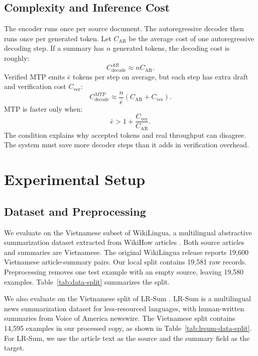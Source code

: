 \documentclass[11pt]{article}
\begin{document}
\subsection{Complexity and Inference Cost}

The encoder runs once per source document.
The autoregressive decoder then runs once per generated token.
Let $C_{\mathrm{AR}}$ be the average cost of one autoregressive decoding step.
If a summary has $n$ generated tokens, the decoding cost is roughly:
\begin{equation}
C_{\mathrm{decode}}^{AR}\approx nC_{\mathrm{AR}}.
\end{equation}
Verified MTP emits $\bar{e}$ tokens per step on average, but each step has extra draft and verification cost $C_{\mathrm{ver}}$:
\begin{equation}
C_{\mathrm{decode}}^{MTP}
\approx \frac{n}{\bar{e}}(C_{\mathrm{AR}}+C_{\mathrm{ver}}).
\end{equation}
MTP is faster only when:
\begin{equation}
\bar{e} > 1+\frac{C_{\mathrm{ver}}}{C_{\mathrm{AR}}}.
\end{equation}
The condition explains why accepted tokens and real throughput can disagree.
The system must save more decoder steps than it adds in verification overhead.

\section{Experimental Setup}
\label{sec:setup}
\suppressfloats[t]

\subsection{Dataset and Preprocessing}

We evaluate on the Vietnamese subset of WikiLingua, a multilingual abstractive summarization dataset extracted from WikiHow articles \citep{ladhak2020wikilingua}.
Both source articles and summaries are Vietnamese.
The original WikiLingua release reports 19,600 Vietnamese article-summary pairs.
Our local split contains 19,581 raw records.
Preprocessing removes one test example with an empty source, leaving 19,580 examples.
Table~\ref{tab:data-split} summarizes the split.

We also evaluate on the Vietnamese split of LR-Sum \citep{palen-michel-lignos-2023-lr}.
LR-Sum is a multilingual news summarization dataset for less-resourced languages, with human-written summaries from Voice of America newswire.
The Vietnamese split contains 14,595 examples in our processed copy, as shown in Table~\ref{tab:lrsum-data-split}.
For LR-Sum, we use the article text as the source and the summary field as the target.
\end{document}

